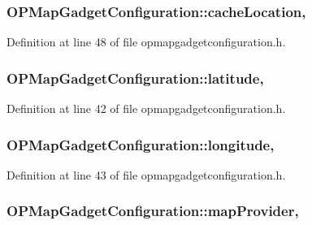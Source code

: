 \hypertarget{group___o_p_map_plugin_ga182bffa488612f55a34e696590887dbf}{
\subsubsection[{cache\-Location}]{ O\-P\-Map\-Gadget\-Configuration\-::cache\-Location\hspace{0.3cm}{\ttfamily [read]}, {\ttfamily [write]}}}\label{group___o_p_map_plugin_ga182bffa488612f55a34e696590887dbf}


Definition at line 48 of file opmapgadgetconfiguration.\-h.

\hypertarget{group___o_p_map_plugin_gaadef11a946190d55fa1bc45821414b77}{
\subsubsection[{latitude}]{ O\-P\-Map\-Gadget\-Configuration\-::latitude\hspace{0.3cm}{\ttfamily [read]}, {\ttfamily [write]}}}\label{group___o_p_map_plugin_gaadef11a946190d55fa1bc45821414b77}


Definition at line 42 of file opmapgadgetconfiguration.\-h.

\hypertarget{group___o_p_map_plugin_ga7832a8e775f6e51898ad0075b150ccd5}{
\subsubsection[{longitude}]{ O\-P\-Map\-Gadget\-Configuration\-::longitude\hspace{0.3cm}{\ttfamily [read]}, {\ttfamily [write]}}}\label{group___o_p_map_plugin_ga7832a8e775f6e51898ad0075b150ccd5}


Definition at line 43 of file opmapgadgetconfiguration.\-h.

\hypertarget{group___o_p_map_plugin_ga6796d346f4d9edbe710a92a987f88659}{
\subsubsection[{map\-Provider}]{ O\-P\-Map\-Gadget\-Configuration\-::map\-Provider\hspace{0.3cm}{\ttfamily [read]}, {\ttfamily [write]}}}\label{group___o_p_map_plugin_ga6796d346f4d9edbe710a92a987f88659}


